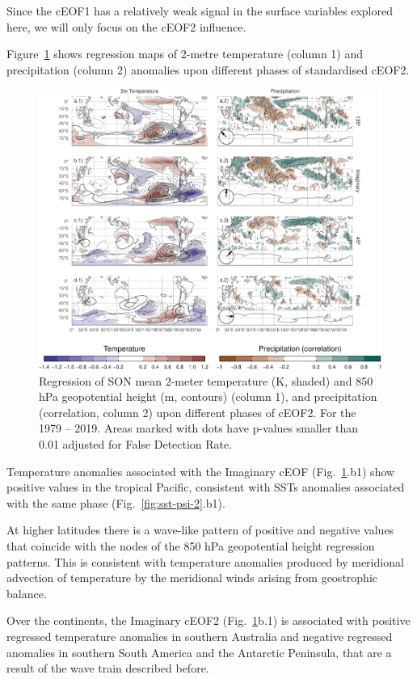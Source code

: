 \documentclass[smallextended]{svjour3}       %
\begin{document}
Since the cEOF1 has a relatively weak signal in the surface variables explored here, we will only focus on the cEOF2 influence.

Figure~\ref{fig:pp-temp-2} shows regression maps of 2-metre temperature (column 1) and precipitation (column 2) anomalies upon different phases of standardised cEOF2.



\begin{figure}
\centering
\includegraphics{../figures/pp-temp-2-1.pdf}
\caption{\label{fig:pp-temp-2}Regression of SON mean 2-meter temperature (K, shaded) and 850 hPa geopotential height (m, contours) (column 1), and precipitation (correlation, column 2) upon different phases of cEOF2. For the 1979 -- 2019. Areas marked with dots have p-values smaller than 0.01 adjusted for False Detection Rate.}
\end{figure}

Temperature anomalies associated with the Imaginary cEOF (Fig.~\ref{fig:pp-temp-2}.b1) show positive values in the tropical Pacific, consistent with SSTs anomalies associated with the same phase (Fig.~\ref{fig:sst-psi-2}.b1).

At higher latitudes there is a wave-like pattern of positive and negative values that coincide with the nodes of the 850 hPa geopotential height regression patterns.
This is consistent with temperature anomalies produced by meridional advection of temperature by the meridional winds arising from geostrophic balance.

Over the continents, the Imaginary cEOF2 (Fig.~\ref{fig:pp-temp-2}b.1) is associated with positive regressed temperature anomalies in southern Australia and negative regressed anomalies in southern South America and the Antarctic Peninsula, that are a result of the wave train described before.
\end{document}
